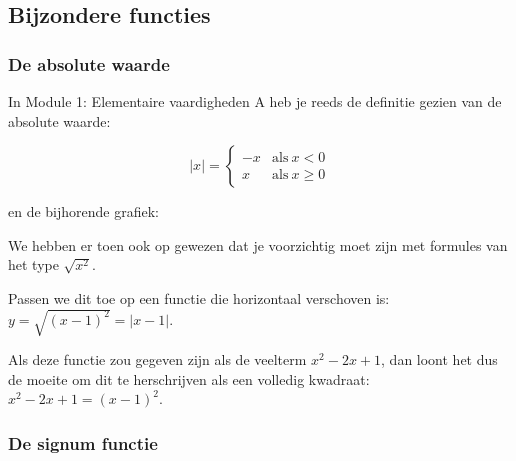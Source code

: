 


\subsection{Bijzondere functies}

\subsubsection{De absolute waarde}

In Module 1: Elementaire vaardigheden A heb je reeds de
definitie gezien van de absolute waarde:

\begin{equation*}
\left|x\right|=\begin{cases}
-x & \textrm{als}\:x<0\\
x & \textrm{als}\:x\geq0
\end{cases}
\end{equation*}

en de bijhorende grafiek:

\begin{figure}[H]
	\centering

\end{figure}



We hebben er toen ook op gewezen dat je voorzichtig moet
zijn met formules van het type $\sqrt{x^{2}}$.

Passen we dit toe op een functie die horizontaal verschoven
is: $y=\sqrt{(x-1)^{2}}=\left|x-1\right|$.

Als deze functie zou gegeven zijn als de veelterm $x^{2}-2x+1$,
dan loont het dus de moeite om dit te herschrijven als een volledig
kwadraat: ${\displaystyle x^{2}-2x+1=\left(x-1\right)^{2}}$.


\subsubsection{De signum functie}

